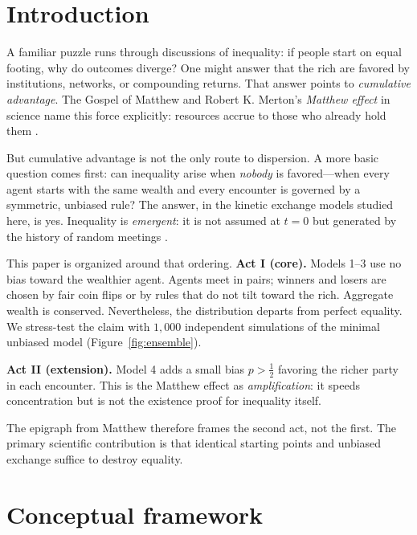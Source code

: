 \documentclass[12pt,a4paper]{article}
\begin{document}
\section{Introduction}
\label{sec:intro}

A familiar puzzle runs through discussions of inequality: if people start on equal footing, why do outcomes diverge?
One might answer that the rich are favored by institutions, networks, or compounding returns.
That answer points to \emph{cumulative advantage}.
The Gospel of Matthew and Robert K. Merton's \emph{Matthew effect} in science name this force explicitly: resources accrue to those who already hold them \citep{merton1968, matthew2529}.

But cumulative advantage is not the only route to dispersion.
A more basic question comes first: can inequality arise when \emph{nobody} is favored---when every agent starts with the same wealth and every encounter is governed by a symmetric, unbiased rule?
The answer, in the kinetic exchange models studied here, is yes.
Inequality is \emph{emergent}: it is not assumed at $t=0$ but generated by the history of random meetings \citep{dragulescu2000, schelling1971, epstein2006, farmer2013}.

This paper is organized around that ordering.
\textbf{Act I (core).} Models 1--3 use no bias toward the wealthier agent.
Agents meet in pairs; winners and losers are chosen by fair coin flips or by rules that do not tilt toward the rich.
Aggregate wealth is conserved.
Nevertheless, the distribution departs from perfect equality.
We stress-test the claim with $1{,}000$ independent simulations of the minimal unbiased model (Figure~\ref{fig:ensemble}).

\textbf{Act II (extension).} Model 4 adds a small bias $p > \tfrac{1}{2}$ favoring the richer party in each encounter.
This is the Matthew effect as \emph{amplification}: it speeds concentration but is not the existence proof for inequality itself.

The epigraph from Matthew therefore frames the second act, not the first.
The primary scientific contribution is that identical starting points and unbiased exchange suffice to destroy equality.

\section{Conceptual framework}
\label{sec:concepts}
\end{document}
